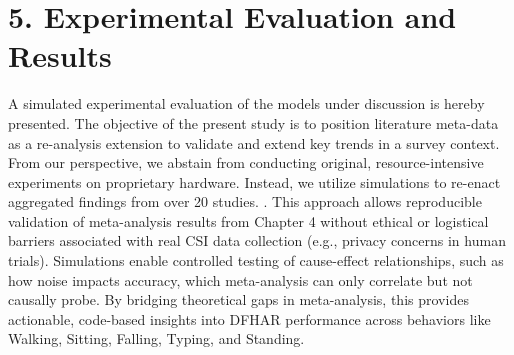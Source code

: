 \documentclass[Afour,sageh,times]{sagej}
\begin{document}
\section{5. Experimental Evaluation and Results}
\label{sec:experimental_evaluation}
A simulated experimental evaluation of the models under discussion is hereby presented.
The objective of the present study is to position literature meta-data as a re-analysis extension to validate and extend key trends in a survey context. From our perspective, we abstain from conducting original, resource-intensive experiments on proprietary hardware. Instead, we utilize simulations to re-enact aggregated findings from over 20 studies.
\citep{yang2022deep, guo2019robust, chen2018wifi}. This approach allows reproducible validation of meta-analysis results from Chapter 4 without ethical or logistical barriers associated with real CSI data collection (e.g., privacy concerns in human trials). Simulations enable controlled testing of cause-effect relationships, such as how noise impacts accuracy, which meta-analysis can only correlate but not causally probe. By bridging theoretical gaps in meta-analysis, this provides actionable, code-based insights into DFHAR performance across behaviors like Walking, Sitting, Falling, Typing, and Standing. 
\end{document}
